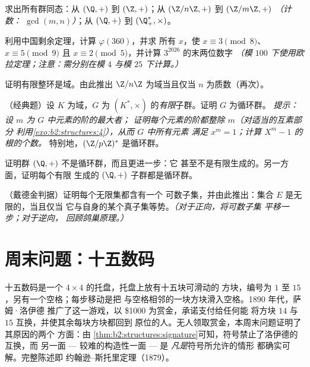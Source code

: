 \begin{exercise}[$\star\star$]\label{exo:b2:structures:7}
求出所有群同态：从 $(\Q, +)$ 到 $(\Z, +)$；从
$(\Z/n\Z, +)$ 到 $(\Z/m\Z, +)$ \emph{（计数：
$\gcd(m,n)$）}；从 $(\Q, +)$ 到 $(\Q_+^*, \times)$。
\end{exercise}

\begin{exercise}[$\star\star$]\label{exo:b2:structures:8}
利用中国剩余定理，计算 $\varphi(360)$，并求
所有 $x$，使 $x \equiv 3 \pmod 8$、$x \equiv 5 \pmod 9$ 且 $x
\equiv 2 \pmod 5$，并计算 $3^{2026}$ 的末两位数字
\emph{（模 $100$ 下使用欧拉定理；注意：需分别在模 $4$ 与模 $25$ 下计算。）}
\end{exercise}

\begin{exercise}[$\star\star\star$]\label{exo:b2:structures:9}
证明有限整环是域。由此推出
$\Z/n\Z$ 为域当且仅当 $n$ 为质数（再次）。
\end{exercise}

\begin{exercise}[$\star\star\star$]\label{exo:b2:structures:10}
（经典题）设 $K$ 为域，$G$ 为
$(K^*, \times)$ 的\emph{有限}子群。证明 $G$ 为循环群。
\emph{提示：设 $m$ 为 $G$ 中元素的阶的最大者；
证明每个元素的阶都整除 $m$（对适当的互素部分
利用\cref{exo:b2:structures:4}），从而 $G$ 中所有元素
满足 $x^m = 1$；计算 $X^m - 1$ 的根的个数。}
特别地，$(\Z/p\Z)^*$ 是循环群。
\end{exercise}

\begin{exercise}[$\star\star\star$]\label{exo:b2:structures:11}
证明群 $(\Q, +)$ 不是循环群，而且更进一步：它
甚至不是有限生成的。另一方面，证明每个有限
生成的 $(\Q, +)$ 子群都是循环群。
\end{exercise}

\begin{exercise}[$\star\star$]\label{exo:b2:structures:12}
（戴德金判据）证明每个无限集都含有一个
可数子集，并由此推出：集合 $E$ 是无限的，当且仅当
它与自身的某个真子集等势。\emph{（对于正向，将可数子集
平移一步；对于逆向，
回顾鸽巢原理。）}
\end{exercise}

\section{周末问题：十五数码}

十五数码是一个 $4 \times 4$ 的托盘，托盘上放有十五块可滑动的
方块，编号为 $1$ 至 $15$，另有一个空格；每步移动是把
与空格相邻的一块方块滑入空格。1890 年代，萨姆·洛伊德
推广了这一游戏，以 \$1000 为赏金，承诺支付给任何能
将方块 $14$ 与 $15$ 互换，并使其余每块方块都回到
原位的人。无人领取赏金，本周末问题证明了其原因的两个
方面：由
\cref{thm:b2:structures:signature}可知，符号禁止了洛伊德的互换，而
另一面 --- 较难的构造性一面 --- 是 \emph{凡是}符号所允许的情形
都确实可解。完整陈述即
约翰逊–斯托里定理（1879）。

